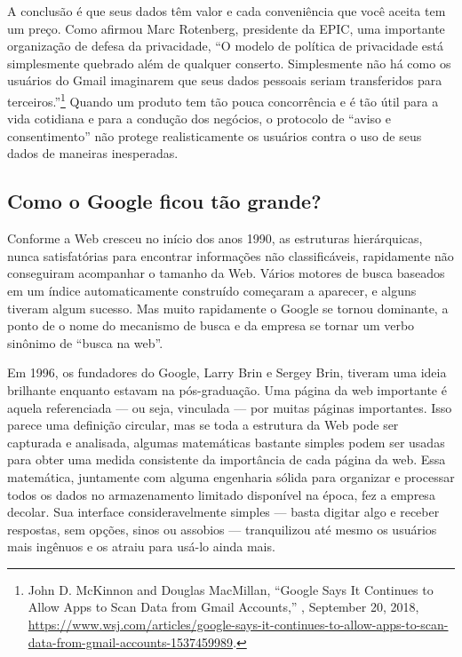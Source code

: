 A conclusão é que seus dados têm valor e cada conveniência que você aceita tem um preço. Como
afirmou Marc Rotenberg, presidente da EPIC, uma importante organização de defesa da privacidade,
``O modelo de política de privacidade está simplesmente quebrado além de qualquer conserto.
Simplesmente não há como os usuários do Gmail imaginarem que seus dados pessoais seriam
transferidos para terceiros.''\footnote{John D. McKinnon and Douglas MacMillan, ``Google Says
It Continues to Allow Apps to Scan Data from Gmail Accounts,'' ,
September 20, 2018,
\url{https://www.wsj.com/articles/google-says-it-continues-to-allow-apps-to-scan-data-from-gmail-accounts-1537459989}.}
Quando um produto tem tão pouca concorrência e é tão útil para a vida cotidiana e para a
condução dos negócios, o protocolo de ``aviso e consentimento'' não protege realisticamente
os usuários contra o uso de seus dados de maneiras inesperadas.

\subsection{Como o Google ficou tão grande?}
\label{gatekeepers:como-o-google}

Conforme a Web cresceu no início dos anos 1990, as estruturas hierárquicas, nunca satisfatórias
para encontrar informações não classificáveis, rapidamente não conseguiram acompanhar o tamanho
da Web. Vários motores de busca baseados em um índice automaticamente construído começaram a
aparecer, e alguns tiveram algum sucesso. Mas muito rapidamente o Google se tornou dominante, a
ponto de o nome do mecanismo de busca e da empresa se tornar um verbo sinônimo de ``busca na web''.

Em 1996, os fundadores do Google, Larry Brin e Sergey Brin, tiveram uma ideia brilhante enquanto
estavam na pós-graduação. Uma página da web importante é aquela referenciada --- ou seja,
vinculada --- por muitas páginas importantes. Isso parece uma definição circular, mas se toda a
estrutura da Web pode ser capturada e analisada, algumas matemáticas bastante simples podem ser
usadas para obter uma medida consistente da importância de cada página da web. Essa matemática,
juntamente com alguma engenharia sólida para organizar e processar todos os dados no
armazenamento limitado disponível na época, fez a empresa decolar. Sua interface
consideravelmente simples --- basta digitar algo e receber respostas, sem opções, sinos ou
assobios --- tranquilizou até mesmo os usuários mais ingênuos e os atraiu para usá-lo ainda mais.

